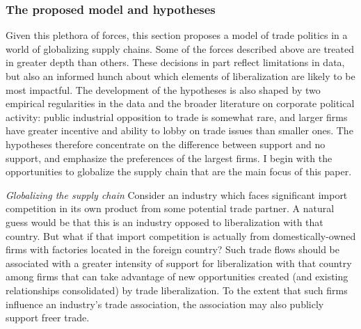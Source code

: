 \documentclass[hidelinks,12pt,letter]{article}
\begin{document}
\subsubsection*{The proposed model and hypotheses}
Given this plethora of forces, this section proposes a model of trade politics in a world of globalizing supply chains. Some of the forces described above are treated in greater depth than others. These decisions in part reflect limitations in data, but also an informed hunch about which elements of liberalization are likely to be most impactful. The development of the hypotheses is also shaped by two empirical regularities in the data and the broader literature on corporate political activity: public industrial opposition to trade is somewhat rare, and larger firms have greater incentive and ability to lobby on trade issues than smaller ones. The hypotheses therefore concentrate on the difference between support and no support, and emphasize the preferences of the largest firms. I begin with the opportunities to globalize the supply chain that are the main focus of this paper.\medskip

\noindent \textit{Globalizing the supply chain}\; Consider an industry which faces significant import competition in its own product from some potential trade partner. A natural guess would be that this is an industry opposed to liberalization with that country. But what if that import competition is actually from domestically-owned firms with factories located in the foreign country? Such trade flows should be associated with a greater intensity of support for liberalization with that country among firms that can take advantage of new opportunities created (and existing relationships consolidated) by trade liberalization. %
To the extent that such firms influence an industry's trade association, the association may also publicly support freer trade.
\end{document}
